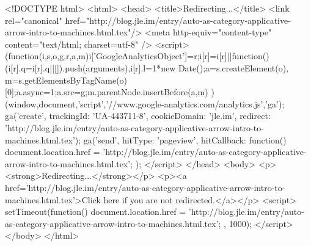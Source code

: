 <!DOCTYPE html>
<html>
<head>
<title>Redirecting...</title>
<link rel="canonical" href="http://blog.jle.im/entry/auto-as-category-applicative-arrow-intro-to-machines.html.tex"/>
<meta http-equiv="content-type" content="text/html; charset=utf-8" />
<script>
(function(i,s,o,g,r,a,m){i['GoogleAnalyticsObject']=r;i[r]=i[r]||function(){
(i[r].q=i[r].q||[]).push(arguments)},i[r].l=1*new Date();a=s.createElement(o),
m=s.getElementsByTagName(o)[0];a.async=1;a.src=g;m.parentNode.insertBefore(a,m)
})(window,document,'script','//www.google-analytics.com/analytics.js','ga');
ga('create', { trackingId: 'UA-443711-8', cookieDomain: 'jle.im', redirect: 'http://blog.jle.im/entry/auto-as-category-applicative-arrow-intro-to-machines.html.tex'});
ga('send', { hitType: 'pageview', hitCallback: function() { document.location.href = 'http://blog.jle.im/entry/auto-as-category-applicative-arrow-intro-to-machines.html.tex'; } });
</script>
</head>
<body>
  <p><strong>Redirecting...</strong></p>
  <p><a href='http://blog.jle.im/entry/auto-as-category-applicative-arrow-intro-to-machines.html.tex'>Click here if you are not redirected.</a></p>
  <script>
    setTimeout(function() { document.location.href = 'http://blog.jle.im/entry/auto-as-category-applicative-arrow-intro-to-machines.html.tex'; }, 1000);
  </script>
</body>
</html>
